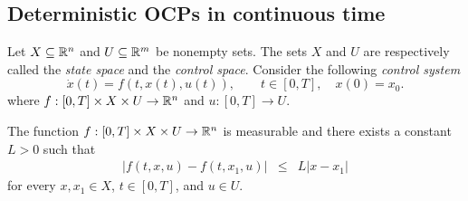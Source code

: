 \subsection{Deterministic OCPs in continuous time}

Let $X\subseteq\mathbb{R}^n$ and $U\subseteq \mathbb{R}^m$ be nonempty sets. The sets $X$ and $U$ are 
respectively called the {\it state space} and the {\it control space}. Consider 
the following {\it control system}
\begin{equation}\label{CoDiffEq}
\dot{x}(t)=f(t,x(t),u(t)),\qquad t\in[0,T], \quad x(0)=x_0.
\end{equation}
where $f:[0,T]\times X\times U\to \mathbb{R}^n$ and $u:[0,T]\to U$. 

\begin{assumption}\label{Assum1}  The function $f:[0,T]\times X\times U\to \mathbb{R}^n$
is measurable and there exists a constant $L>0$ such that
\begin{eqnarray}
  |f(t,x,u)-f(t,x_1,u)| & \leq & L|x-x_1|\label{LipfInx}
\end{eqnarray}
for every $x,x_1\in X$, $t\in[0,T]$, and $u\in U$.
\end{assumption}



